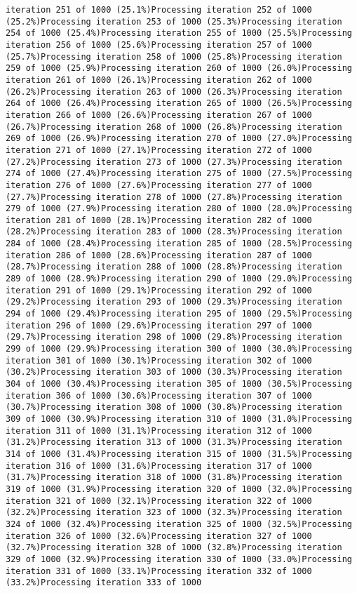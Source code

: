 \documentclass[
]{article}
\begin{document}
\begin{verbatim}
iteration 251 of 1000 (25.1%)Processing iteration 252 of 1000 (25.2%)Processing iteration 253 of 1000 (25.3%)Processing iteration 254 of 1000 (25.4%)Processing iteration 255 of 1000 (25.5%)Processing iteration 256 of 1000 (25.6%)Processing iteration 257 of 1000 (25.7%)Processing iteration 258 of 1000 (25.8%)Processing iteration 259 of 1000 (25.9%)Processing iteration 260 of 1000 (26.0%)Processing iteration 261 of 1000 (26.1%)Processing iteration 262 of 1000 (26.2%)Processing iteration 263 of 1000 (26.3%)Processing iteration 264 of 1000 (26.4%)Processing iteration 265 of 1000 (26.5%)Processing iteration 266 of 1000 (26.6%)Processing iteration 267 of 1000 (26.7%)Processing iteration 268 of 1000 (26.8%)Processing iteration 269 of 1000 (26.9%)Processing iteration 270 of 1000 (27.0%)Processing iteration 271 of 1000 (27.1%)Processing iteration 272 of 1000 (27.2%)Processing iteration 273 of 1000 (27.3%)Processing iteration 274 of 1000 (27.4%)Processing iteration 275 of 1000 (27.5%)Processing iteration 276 of 1000 (27.6%)Processing iteration 277 of 1000 (27.7%)Processing iteration 278 of 1000 (27.8%)Processing iteration 279 of 1000 (27.9%)Processing iteration 280 of 1000 (28.0%)Processing iteration 281 of 1000 (28.1%)Processing iteration 282 of 1000 (28.2%)Processing iteration 283 of 1000 (28.3%)Processing iteration 284 of 1000 (28.4%)Processing iteration 285 of 1000 (28.5%)Processing iteration 286 of 1000 (28.6%)Processing iteration 287 of 1000 (28.7%)Processing iteration 288 of 1000 (28.8%)Processing iteration 289 of 1000 (28.9%)Processing iteration 290 of 1000 (29.0%)Processing iteration 291 of 1000 (29.1%)Processing iteration 292 of 1000 (29.2%)Processing iteration 293 of 1000 (29.3%)Processing iteration 294 of 1000 (29.4%)Processing iteration 295 of 1000 (29.5%)Processing iteration 296 of 1000 (29.6%)Processing iteration 297 of 1000 (29.7%)Processing iteration 298 of 1000 (29.8%)Processing iteration 299 of 1000 (29.9%)Processing iteration 300 of 1000 (30.0%)Processing iteration 301 of 1000 (30.1%)Processing iteration 302 of 1000 (30.2%)Processing iteration 303 of 1000 (30.3%)Processing iteration 304 of 1000 (30.4%)Processing iteration 305 of 1000 (30.5%)Processing iteration 306 of 1000 (30.6%)Processing iteration 307 of 1000 (30.7%)Processing iteration 308 of 1000 (30.8%)Processing iteration 309 of 1000 (30.9%)Processing iteration 310 of 1000 (31.0%)Processing iteration 311 of 1000 (31.1%)Processing iteration 312 of 1000 (31.2%)Processing iteration 313 of 1000 (31.3%)Processing iteration 314 of 1000 (31.4%)Processing iteration 315 of 1000 (31.5%)Processing iteration 316 of 1000 (31.6%)Processing iteration 317 of 1000 (31.7%)Processing iteration 318 of 1000 (31.8%)Processing iteration 319 of 1000 (31.9%)Processing iteration 320 of 1000 (32.0%)Processing iteration 321 of 1000 (32.1%)Processing iteration 322 of 1000 (32.2%)Processing iteration 323 of 1000 (32.3%)Processing iteration 324 of 1000 (32.4%)Processing iteration 325 of 1000 (32.5%)Processing iteration 326 of 1000 (32.6%)Processing iteration 327 of 1000 (32.7%)Processing iteration 328 of 1000 (32.8%)Processing iteration 329 of 1000 (32.9%)Processing iteration 330 of 1000 (33.0%)Processing iteration 331 of 1000 (33.1%)Processing iteration 332 of 1000 (33.2%)Processing iteration 333 of 1000 
\end{verbatim}
\end{document}
